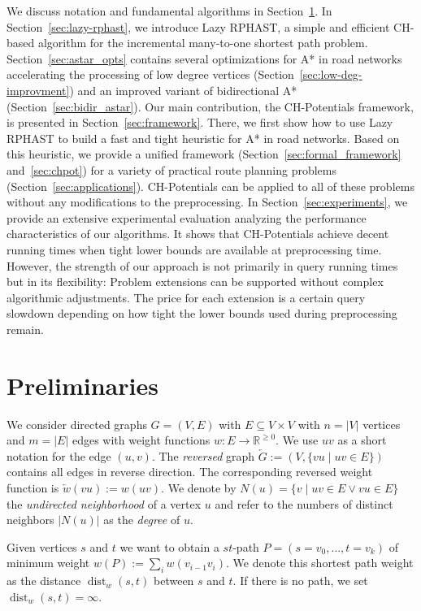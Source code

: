 \documentclass[manuscript,review]{acmart}
\newcommand*{\dist}{\operatorname{dist}}
\begin{document}
We discuss notation and fundamental algorithms in Section~\ref{sec:preliminaries}.
In Section~\ref{sec:lazy-rphast}, we introduce Lazy RPHAST, a simple and efficient CH-based algorithm for the incremental many-to-one shortest path problem.
Section~\ref{sec:astar_opts} contains several optimizations for A* in road networks accelerating the processing of low degree vertices (Section~\ref{sec:low-deg-improvment}) and an improved variant of bidirectional A* (Section~\ref{sec:bidir_astar}).
Our main contribution, the CH-Potentials framework, is presented in Section~\ref{sec:framework}.
There, we first show how to use Lazy RPHAST to build a fast and tight heuristic for A* in road networks.
Based on this heuristic, we provide a unified framework (Section~\ref{sec:formal_framework} and~\ref{sec:chpot}) for a variety of practical route planning problems (Section~\ref{sec:applications}).
CH-Potentials can be applied to all of these problems without any modifications to the preprocessing.
In Section~\ref{sec:experiments}, we provide an extensive experimental evaluation analyzing the performance characteristics of our algorithms.
It shows that CH-Potentials achieve decent running times when tight lower bounds are available at preprocessing time.
However, the strength of our approach is not primarily in query running times but in its flexibility:
Problem extensions can be supported without complex algorithmic adjustments.
The price for each extension is a certain query slowdown depending on how tight the lower bounds used during preprocessing remain.

\section{Preliminaries}\label{sec:preliminaries}

We consider directed graphs $G=(V,E)$ with $E \subseteq V \times V$ with $n=|V|$ vertices and $m=|E|$ edges with weight functions $w : E \to \mathbb{R}^{\geq 0}$.
We use $uv$ as a short notation for the edge $(u,v)$.
The \emph{reversed} graph $\overleftarrow{G} := (V, \{ vu \mid uv \in E \})$ contains all edges in reverse direction.
The corresponding reversed weight function is $\overleftarrow{w}(vu) := w(uv)$.
We denote by $N(u) = \{ v \mid uv \in E \vee vu \in E \}$ the \emph{undirected neighborhood} of a vertex $u$ and refer to the numbers of distinct neighbors $|N(u)|$ as the \emph{degree} of $u$.

Given vertices $s$ and $t$ we want to obtain a $st$-path $P=(s=v_0,\dots,t=v_k)$ of minimum weight $w(P) := \sum_{i} w(v_{i-1}v_i)$.
We denote this shortest path weight as the distance $\dist_w(s,t)$ between $s$ and $t$.
If there is no path, we set $\dist_w(s,t)=\infty$.
\end{document}
